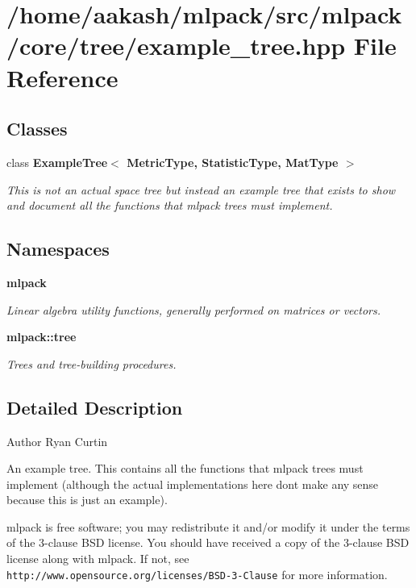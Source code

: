 \section{/home/aakash/mlpack/src/mlpack/core/tree/example\+\_\+tree.hpp File Reference}
\label{example__tree_8hpp}
\subsection*{Classes}
\begin{DoxyCompactItemize}
\item 
class \textbf{ Example\+Tree$<$ Metric\+Type, Statistic\+Type, Mat\+Type $>$}
\begin{DoxyCompactList}\small\item\em This is not an actual space tree but instead an example tree that exists to show and document all the functions that mlpack trees must implement. \end{DoxyCompactList}\end{DoxyCompactItemize}
\subsection*{Namespaces}
\begin{DoxyCompactItemize}
\item 
 \textbf{ mlpack}
\begin{DoxyCompactList}\small\item\em Linear algebra utility functions, generally performed on matrices or vectors. \end{DoxyCompactList}\item 
 \textbf{ mlpack\+::tree}
\begin{DoxyCompactList}\small\item\em Trees and tree-\/building procedures. \end{DoxyCompactList}\end{DoxyCompactItemize}


\subsection{Detailed Description}
\begin{DoxyAuthor}{Author}
Ryan Curtin
\end{DoxyAuthor}
An example tree. This contains all the functions that mlpack trees must implement (although the actual implementations here don\textquotesingle{}t make any sense because this is just an example).

mlpack is free software; you may redistribute it and/or modify it under the terms of the 3-\/clause B\+SD license. You should have received a copy of the 3-\/clause B\+SD license along with mlpack. If not, see {\tt http\+://www.\+opensource.\+org/licenses/\+B\+S\+D-\/3-\/\+Clause} for more information. 